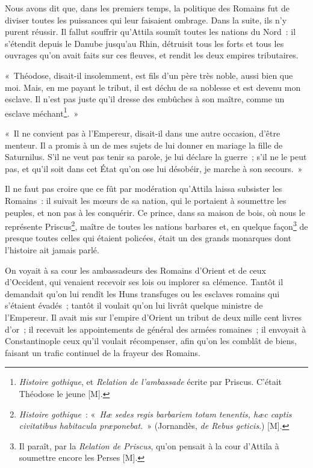 \documentclass[french,twoside]{book} %
\begin{document}
Nous avons dit que, dans les premiers temps, la politique des Romains fut de diviser toutes les puissances qui leur faisaient ombrage. Dans la suite, ils n’y purent réussir. Il fallut souffrir qu’Attila soumît toutes les nations du Nord : il s’étendit depuis le Danube jusqu’au Rhin, détruisit tous les forts et tous les ouvrages qu’on avait faits sur ces fleuves, et rendit les deux empires tributaires.\par
« Théodose, disait-il insolemment, est fils d’un père très noble, aussi bien que moi. Mais, en me payant le tribut, il est déchu de sa noblesse et est devenu mon esclave. Il n’est pas juste qu’il dresse des embûches à son maître, comme un esclave méchant\footnote{{\itshape Histoire gothique}, et {\itshape Relation de l’ambassade} écrite par Priscus. C’était Théodose le jeune [M].}. »\par
« Il ne convient pas à l’Empereur, disait-il dans une autre occasion, d’être menteur. Il a promis à un de mes sujets de lui donner en mariage la fille de Saturnilus. S’il ne veut pas tenir sa parole, je lui déclare la guerre ; s’il ne le peut pas, et qu’il soit dans cet État qu’on ose lui désobéir, je marche à son secours. »\par
Il ne faut pas croire que ce fût par modération qu’Attila laissa subsister les Romains : il suivait les mœurs de sa nation, qui le portaient à soumettre les peuples, et non pas à les conquérir. Ce prince, dans sa maison de bois, où nous le représente Priscus\footnote{{\itshape Histoire gothique} : « {\itshape Hæ sedes regis barbariem totam tenentis, hæc captis civitatibus habitacula præponebat.} » (Jornandès, {\itshape de Rebus geticis}.) [M].}, maître de toutes les nations barbares et, en quelque façon\footnote{Il paraît, par la {\itshape Relation de Priscus}, qu’on pensait à la cour d’Attila à soumettre encore les Perses [M].} de presque toutes celles qui étaient policées, était un des grands monarques dont l’histoire ait jamais parlé.\par
On voyait à sa cour les ambassadeurs des Romains d’Orient et de ceux d’Occident, qui venaient recevoir ses lois ou implorer sa clémence. Tantôt il demandait qu’on lui rendît les Huns transfuges ou les esclaves romains qui s’étaient évadés ; tantôt il voulait qu’on lui livrât quelque ministre de l’Empereur. Il avait mis sur l’empire d’Orient un tribut de deux mille cent livres d’or ; il recevait les appointements de général des armées romaines ; il envoyait à Constantinople ceux qu’il voulait récompenser, afin qu’on les comblât de biens, faisant un trafic continuel de la frayeur des Romains.\par
\end{document}
